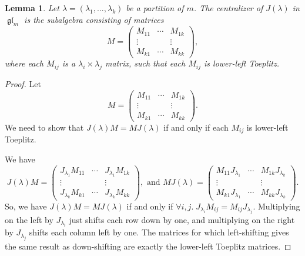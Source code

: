 \documentclass[12pt,psamsfonts]{article}
\DeclareMathOperator{\gl}{\mathfrak{gl}}
\newtheorem{lemma}[theorem]{Lemma}
\begin{document}
\begin{lemma}\label{nilpotent_centralizer}
    Let \(\lambda = (\lambda_1, ..., \lambda_k)\) be a partition of \(m\).
    The centralizer of \(J(\lambda)\) in \(\gl_m\) is the subalgebra consisting of matrices 
    \[M = \begin{pmatrix}
        M_{11} & \cdots & M_{1k}\\
        \vdots &        & \vdots\\
        M_{k1} & \cdots & M_{kk}
    \end{pmatrix},\]
    where each \(M_{ij}\) is a \(\lambda_i \times \lambda_j\) matrix, such that each \(M_{ij}\) is lower-left Toeplitz.
\end{lemma}
\begin{proof}
    Let 
    \[M = \begin{pmatrix}
        M_{11} & \cdots & M_{1k}\\
        \vdots &        & \vdots\\
        M_{k1} & \cdots & M_{kk}
    \end{pmatrix}.\]
    We need to show that \(J(\lambda)M = MJ(\lambda)\) if and only if each \(M_{ij}\) is lower-left Toeplitz.
    \par We have 
    \[J(\lambda)M = \begin{pmatrix}
        J_{\lambda_1}M_{11} & \cdots & J_{\lambda_1}M_{1k}\\
        \vdots & & \vdots\\
        J_{\lambda_k}M_{k1} & \cdots & J_{\lambda_k}M_{kk}
    \end{pmatrix}, \textrm{ and } MJ(\lambda) = \begin{pmatrix}
        M_{11} J_{\lambda_1} & \cdots & M_{1k} J_{\lambda_k}\\
        \vdots & & \vdots\\
        M_{k1} J_{\lambda_1} & \cdots & M_{kk} J_{\lambda_k}
    \end{pmatrix}.\]
    So, we have \(J(\lambda)M = MJ(\lambda)\) if and only if \(\forall i,j. \; J_{\lambda_i} M_{ij} = M_{ij} J_{\lambda_j}\).
    Multiplying on the left by \(J_{\lambda_i}\) just shifts each row down by one, and multiplying on the right by \(J_{\lambda_j}\) shifts each column left by one.
    The matrices for which left-shifting gives the same result as down-shifting are exactly the lower-left Toeplitz matrices.
\end{proof}
\end{document}
